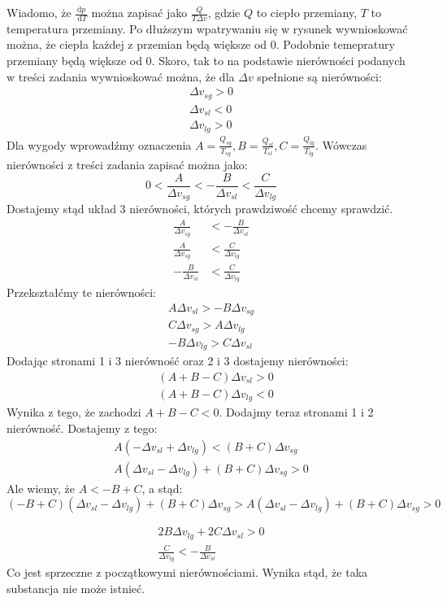 \documentclass[12pt,a4paper]{article}
\begin{document}
Wiadomo, że $\frac{\mathrm{d} p}{\mathrm{~d} T}$ można zapisać jako $\frac{Q}{T \Delta v}$, gdzie $Q$ to ciepło przemiany, $T$ to temperatura przemiany. Po dłuższym wpatrywaniu się w rysunek wywnioskować można, że ciepła każdej z przemian będą większe od 0. Podobnie temepratury przemiany będą większe od 0. Skoro, tak to na podstawie nierówności podanych w treści zadania wywnioskować można, że dla $\Delta v$ spełnione są nierówności:
$$
\begin{gathered}
\Delta v_{s g}>0 \\
\Delta v_{s l}<0 \\
\Delta v_{l g}>0
\end{gathered}
$$
Dla wygody wprowadźmy oznaczenia $A=\frac{Q_{s g}}{T_{s g}}, B=\frac{Q_{s l}}{T_{s l}}, C=\frac{Q_{l g}}{T_{l g}}$. Wówczas nierówności z treści zadania zapisać można jako:
$$
0<\frac{A}{\Delta v_{s g}}<-\frac{B}{\Delta v_{s l}}<\frac{C}{\Delta v_{l g}}
$$
Dostajemy stąd układ 3 nierówności, których prawdziwość chcemy sprawdzić.
$$
\begin{aligned}
\frac{A}{\Delta v_{s g}} &<-\frac{B}{\Delta v_{s l}} \\
\frac{A}{\Delta v_{s g}} &<\frac{C}{\Delta v_{l g}} \\
-\frac{B}{\Delta v_{s l}} &<\frac{C}{\Delta v_{l g}}
\end{aligned}
$$
Przekształćmy te nierówności:
$$
\begin{gathered}
A \Delta v_{s l}>-B \Delta v_{s g} \\
C \Delta v_{s g}>A \Delta v_{l g} \\
-B \Delta v_{l g}>C \Delta v_{s l}
\end{gathered}
$$
Dodając stronami 1 i 3 nierówność oraz 2 i 3 dostajemy nierówności:
$$
\begin{aligned}
&(A+B-C) \Delta v_{s l}>0 \\
&(A+B-C) \Delta v_{l g}<0
\end{aligned}
$$
Wynika z tego, że zachodzi $A+B-C<0$. Dodajmy teraz stronami 1 i 2 nierówność. Dostajemy z tego:
$$
\begin{gathered}
A\left(-\Delta v_{s l}+\Delta v_{l g}\right)<(B+C) \Delta v_{s g} \\
A\left(\Delta v_{s l}-\Delta v_{l g}\right)+(B+C) \Delta v_{s g}>0
\end{gathered}
$$
Ale wiemy, że $A<-B+C$, a stąd:
$$
(-B+C)\left(\Delta v_{s l}-\Delta v_{l g}\right)+(B+C) \Delta v_{s g}>A\left(\Delta v_{s l}-\Delta v_{l g}\right)+(B+C) \Delta v_{s g}>0
$$

$$
\begin{gathered}
2 B \Delta v_{l g}+2 C \Delta v_{s l}>0 \\
\frac{C}{\Delta v_{l g}}<-\frac{B}{\Delta v_{s l}}
\end{gathered}
$$
Co jest sprzeczne z początkowymi nierównościami. Wynika stąd, że taka substancja nie może istnieć.
\end{document}
